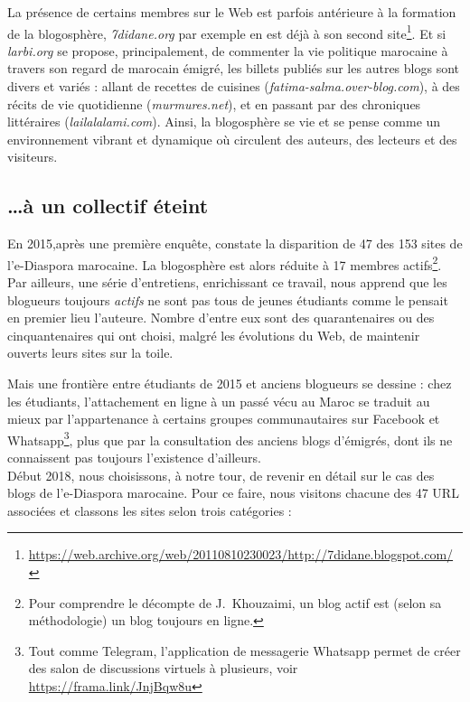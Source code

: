 \documentclass[symmetric,justified,marginals=raggedouter]{tufte-book}
\begin{document}
La présence de certains membres sur le Web est parfois antérieure à la formation de la blogosphère, \textit{7didane.org} par exemple en est déjà à son second site\footnote{\RaggedOuter \url{https://web.archive.org/web/20110810230023/http://7didane.blogspot.com/}}. Et si \textit{larbi.org} se propose, principalement, de commenter la vie politique marocaine à travers son regard de marocain émigré, les billets publiés sur les autres blogs sont divers et variés : allant de recettes de cuisines (\textit{fatima-salma.over-blog.com}), à des récits de vie quotidienne (\textit{murmures.net}), et en passant par des chroniques littéraires (\textit{lailalalami.com}).  Ainsi, la blogosphère se vie et se pense comme un environnement vibrant et dynamique où circulent des auteurs, des lecteurs et des visiteurs.

\subsection{\ldots{}à un collectif éteint}

\noindent En 2015,après une première enquête, \citep{khouzaimi_e-diasporas_2015} constate la disparition de 47 des 153 sites de l'e-Diaspora marocaine. La blogosphère est alors réduite à 17 membres actifs\footnote{\RaggedOuter Pour comprendre le décompte de J.~Khouzaimi, un blog actif est (selon sa méthodologie) un blog toujours en ligne.}. Par ailleurs, une série d'entretiens, enrichissant ce travail, nous apprend que les blogueurs toujours \textit{actifs} ne sont pas tous de jeunes étudiants comme le pensait en premier lieu l'auteure. Nombre d'entre eux sont des quarantenaires ou des cinquantenaires qui ont choisi, malgré les évolutions du Web, de maintenir ouverts leurs sites sur la toile. 

Mais une frontière entre étudiants de 2015 et anciens blogueurs se dessine : chez les étudiants, l'attachement en ligne à un passé vécu au Maroc se traduit au mieux par l'appartenance à certains groupes communautaires sur Facebook et Whatsapp\footnote{\RaggedOuter Tout comme Telegram, l'application de messagerie Whatsapp permet de créer des salon de discussions virtuels à plusieurs, voir \url{https://frama.link/JnjBqw8u}}, plus que par la consultation des anciens blogs d'émigrés, dont ils ne connaissent pas toujours l'existence d'ailleurs. \\

\noindent Début 2018, nous choisissons, à notre tour, de revenir en détail sur le cas des blogs de l'e-Diaspora marocaine. Pour ce faire, nous visitons chacune des 47 URL associées et classons les sites selon trois catégories :
\end{document}
